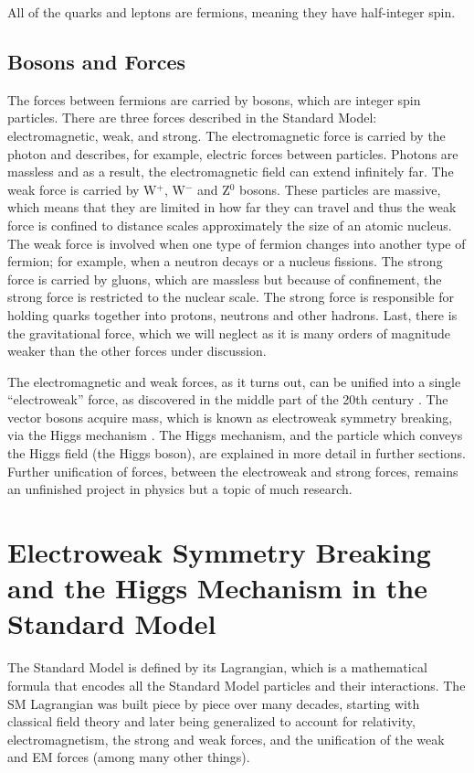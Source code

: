 All of the quarks and leptons are fermions, meaning they have half-integer spin.

\subsection{Bosons and Forces}

The forces between fermions are carried by bosons, which are integer spin particles.  
There are three forces described in the Standard Model: electromagnetic, weak, and 
strong.  The electromagnetic force is carried by the photon and describes, for example, 
electric forces between particles.  Photons are massless and as a result, the electromagnetic 
field can extend infinitely far.  The weak force is carried by W$^+$, 
W$^-$ and Z$^0$ bosons.  These particles are massive, which 
means that they are limited in how far they can travel and thus the weak 
force is confined to distance scales approximately the size of an atomic nucleus.  The 
weak force is involved when one type of fermion changes into another type of fermion; 
for example, when a neutron decays or a nucleus fissions.  The strong force 
is carried by gluons, which are massless but because of confinement, the strong 
force is restricted to the nuclear scale.  The strong force is responsible for holding 
quarks together into protons, neutrons and other hadrons. Last, there is the 
gravitational force, which we will neglect as it is many orders of magnitude weaker 
than the other forces under discussion.

The electromagnetic and weak forces, as it turns out, can be unified into a single 
``electroweak'' force, as discovered in the middle part of the 20th century \cite{Weinberg}.  
The vector bosons acquire mass, which is known as electroweak symmetry breaking, via 
the Higgs mechanism \cite{Higgs-1} \cite{Englert_Brout} \cite{Guralnik_Hagen_Kibble}.  
The Higgs mechanism, and the particle which conveys the Higgs field (the Higgs boson), 
are explained in more detail in further sections.  Further unification of forces, between 
the electroweak and strong forces, remains an unfinished project in physics but a topic of much research.  

\section{Electroweak Symmetry Breaking and the Higgs Mechanism in the Standard Model}
The Standard Model is defined by its Lagrangian, which is a mathematical formula that 
encodes all the Standard Model particles and their interactions.  The SM Lagrangian was built 
piece by piece over many decades, starting with classical field theory and later being 
generalized to account for relativity, electromagnetism, the strong and weak forces, and 
the unification of the weak and EM forces (among many other things).  

